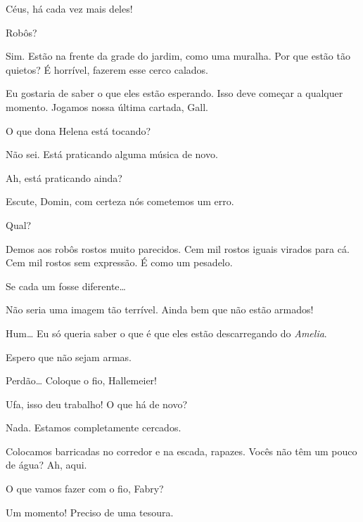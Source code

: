 
 Céus, há cada vez mais deles!

 Robôs?

 Sim. Estão na frente da grade do jardim, como uma muralha. Por que estão
tão quietos? É horrível, fazerem esse cerco calados.

 Eu gostaria de saber o que eles estão esperando. Isso deve começar a qualquer momento. 
Jogamos nossa última cartada, Gall.

 O que dona Helena está tocando?

 Não sei. Está praticando alguma música de novo.

 Ah, está praticando ainda?

 Escute, Domin, com certeza nós cometemos um erro.

  Qual?

 Demos aos robôs rostos muito parecidos. Cem mil rostos iguais virados
para cá. Cem mil rostos sem expressão. É como um pesadelo.

 Se cada um fosse diferente\ldots{}

 Não seria uma imagem tão terrível.  Ainda bem que não estão armados!

 Hum\ldots{}  Eu só queria
saber o que é que eles estão descarregando do \textit{Amelia}.

 Espero que não sejam armas.

 Perdão\ldots{} Coloque o fio, Hallemeier!

  Ufa, isso deu trabalho! O que há de
novo?

 Nada. Estamos completamente cercados.

 Colocamos barricadas no corredor e na escada, rapazes. Vocês não têm
um pouco de água? Ah, aqui. 

 O que vamos fazer com o fio, Fabry?

 Um momento! Preciso de uma tesoura.

